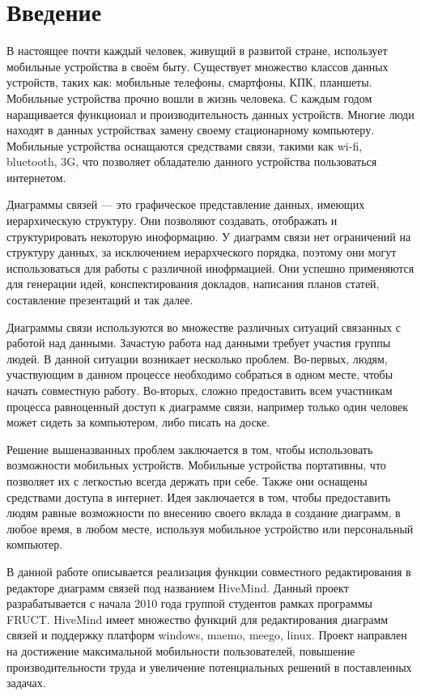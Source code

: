 \newpage

\chapter*{Введение}\label{chap:introduction}

В настоящее почти каждый человек, живущий в развитой стране, использует
мобильные устройства в своём быту. Существует множество классов данных
устройств, таких как: мобильные телефоны, смартфоны, КПК, планшеты.
Мобильные устройства прочно вошли в жизнь человека. С каждым годом наращивается
функционал и производительность данных устройств. Многие люди
находят в данных устройствах замену своему стационарному компьютеру. Мобильные устройства
оснащаются средствами связи, такими как wi-fi, bluetooth, 3G, что позволяет
обладателю данного устройства пользоваться интернетом.

Диаграммы связей --- это графическое представление данных, имеющих
иерархическую структуру. Они позволяют создавать, отображать и
структурировать некоторую иноформацию. У диаграмм связи нет ограничений на
структуру данных, за исключением иерархческого порядка, поэтому они могут
использоваться для работы с различной инофрмацией. Они успешно
применяются для генерации идей, конспектирования докладов, написания планов
статей, составление презентаций и так далее.

Диаграммы связи используются во множестве различных ситуаций связанных с работой
над данными. Зачастую работа над данными требует участия группы людей. В данной
ситуации возникает несколько проблем. Во-первых, людям, участвующим в данном
процессе необходимо собраться в одном месте, чтобы начать совместную работу.
Во-вторых, сложно предоставить всем участникам процесса равноценный доступ к
диаграмме связи, например только один человек может сидеть за компьютером, либо
писать на доске.

Решение вышеназванных проблем заключается в том, чтобы использовать возможности
мобильных устройств. Мобильные устройства портативны, что позволяет их с
легкостью всегда держать при себе. Также они оснащены средствами доступа в
интернет. Идея заключается в том, чтобы предоставить людям равные возможности по
внесению своего вклада в создание диаграмм, в любое время, в любом месте,
используя мобильное устройство или персональный компьютер.

В данной работе описывается реализация функции совместного редактирования в
редакторе диаграмм связей под названием HiveMind. Данный проект разрабатывается
с начала 2010 года группой студентов рамках программы FRUCT. HiveMind имеет
множество функций для редактирования диаграмм связей и поддержку платформ
windows, maemo, meego, linux. Проект направлен на достижение максимальной
мобильности пользователей, повышение производительности труда и увеличение
потенциальных решений в поставленных задачах.

